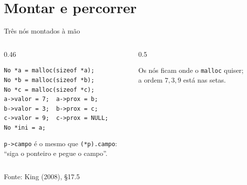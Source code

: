\documentclass[aspectratio=169]{beamer}
\newcommand{\ptr}[1]{($(#1.one split north)!0.5!(#1.south east)$)}
\newcommand{\fonte}[1]{\vfill\hfill{\scriptsize\textcolor{UFSGray}{Fonte: #1}}}
\begin{document}
\section{Montar e percorrer}

\begin{frame}[fragile]{Três nós montados à mão}
  \begin{columns}[c]
    \begin{column}{0.46\textwidth}
\begin{lstlisting}[style=tinyC]
No *a = malloc(sizeof *a);
No *b = malloc(sizeof *b);
No *c = malloc(sizeof *c);
a->valor = 7;  a->prox = b;
b->valor = 3;  b->prox = c;
c->valor = 9;  c->prox = NULL;
No *ini = a;
\end{lstlisting}
      \small
      \texttt{p->campo} é o mesmo que \texttt{(*p).campo}: ``siga o ponteiro
      e pegue o campo''.
    \end{column}
    \begin{column}{0.5\textwidth}
      \begin{center}
      \end{center}
      \scriptsize Os nós ficam onde o \texttt{malloc} quiser; a ordem
      $7, 3, 9$ está nas setas.
    \end{column}
  \end{columns}
  \fonte{King (2008), §17.5~\cite{king2008c}}
\end{frame}
\end{document}

